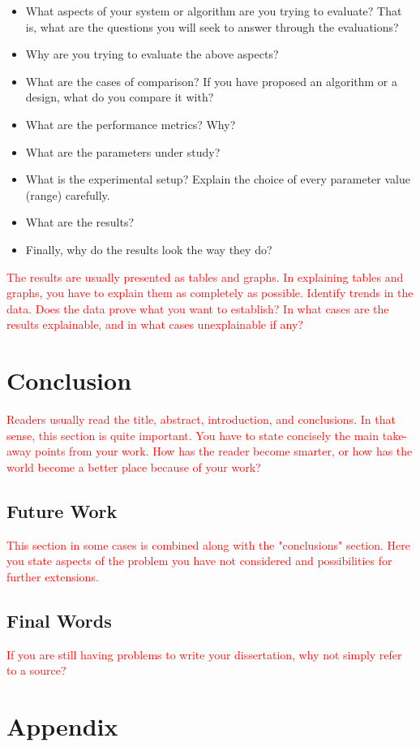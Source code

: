 \documentclass[fyp]{socreport}
\begin{document}
\begin{itemize}
    \color{red}
    \item What aspects of your system or algorithm are you trying to evaluate? That is, what are the questions you will seek to answer through the evaluations?
    \item Why are you trying to evaluate the above aspects?
    \item What are the cases of comparison? If you have proposed an algorithm or a design, what do you compare it with?
    \item What are the performance metrics? Why?
    \item What are the parameters under study?
    \item What is the experimental setup? Explain the choice of every parameter value (range) carefully.
    \item What are the results?
    \item Finally, why do the results look the way they do? 
\end{itemize}

\textcolor{red}{The results are usually presented as tables and graphs. In explaining tables and graphs, you have to explain them as completely as possible. Identify trends in the data. Does the data prove what you want to establish? In what cases are the results explainable, and in what cases unexplainable if any?}

\chapter{Conclusion}
\label{ch:conclusion}
\textcolor{red}{Readers usually read the title, abstract, introduction, and conclusions. In that sense, this section is quite important. You have to state concisely the main take-away points from your work. How has the reader become smarter, or how has the world become a better place because of your work?}

\section{Future Work}
\textcolor{red}{This section in some cases is combined along with the "conclusions" section. Here you state aspects of the problem you have not considered and possibilities for further extensions.}

\section{Final Words}
\textcolor{red}{If you are still having problems to write your dissertation, why not simply refer to a source? \cite{fypguide}}

%
%



\appendix
\chapter{Appendix}
\label{ap-sample}
\end{document}
